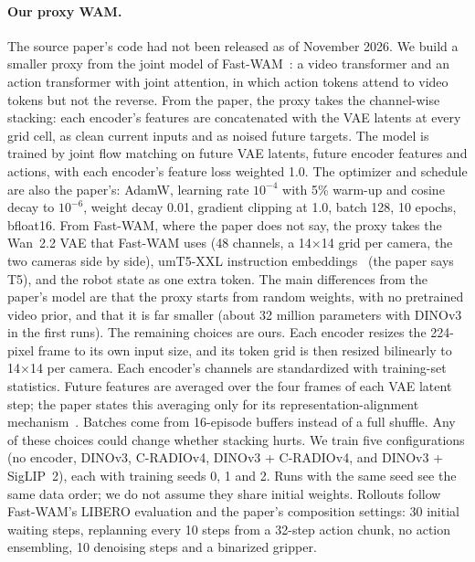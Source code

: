 \paragraph{Our proxy WAM.}
The source paper's code had not been released as of November 2026.
We build a smaller proxy from the joint model of Fast-WAM~: a video transformer and an action transformer with joint attention, in which action tokens attend to video tokens but not the reverse.
From the paper, the proxy takes the channel-wise stacking: each encoder's features are concatenated with the VAE latents at every grid cell, as clean current inputs and as noised future targets.
The model is trained by joint flow matching on future VAE latents, future encoder features and actions, with each encoder's feature loss weighted 1.0.
The optimizer and schedule are also the paper's: AdamW, learning rate $10^{-4}$ with 5\% warm-up and cosine decay to $10^{-6}$, weight decay 0.01, gradient clipping at 1.0, batch 128, 10 epochs, bfloat16.
From Fast-WAM, where the paper does not say, the proxy takes the Wan~2.2 VAE that Fast-WAM uses (48 channels, a 14$\times$14 grid per camera, the two cameras side by side), umT5-XXL instruction embeddings~ (the paper says T5), and the robot state as one extra token.
The main differences from the paper's model are that the proxy starts from random weights, with no pretrained video prior, and that it is far smaller (about 32 million parameters with DINOv3 in the first runs).
The remaining choices are ours.
Each encoder resizes the 224-pixel frame to its own input size, and its token grid is then resized bilinearly to 14$\times$14 per camera.
Each encoder's channels are standardized with training-set statistics.
Future features are averaged over the four frames of each VAE latent step; the paper states this averaging only for its representation-alignment mechanism~.
Batches come from 16-episode buffers instead of a full shuffle.
Any of these choices could change whether stacking hurts.
We train five configurations (no encoder, DINOv3, C-RADIOv4, DINOv3 + C-RADIOv4, and DINOv3 + SigLIP~2), each with training seeds 0, 1 and 2.
Runs with the same seed see the same data order; we do not assume they share initial weights.
Rollouts follow Fast-WAM's LIBERO evaluation and the paper's composition settings: 30 initial waiting steps, replanning every 10 steps from a 32-step action chunk, no action ensembling, 10 denoising steps and a binarized gripper.

